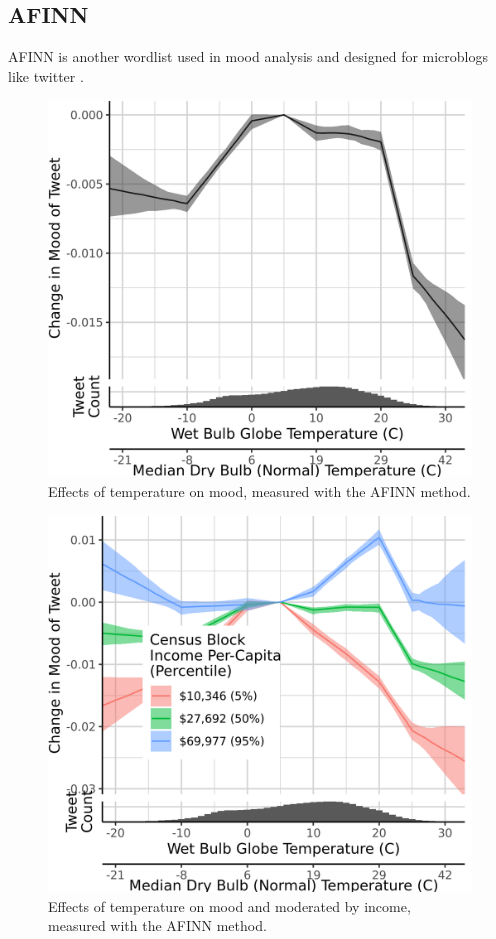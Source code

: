 \documentclass{article}
\begin{document}
\subsection{AFINN}

AFINN is another wordlist used in mood analysis and designed for microblogs like twitter \cite{nielsen2011new}.

\begin{figure}[H]
  \centering
  \includegraphics[width=0.6\linewidth]{../res/afinn-wbgt.png}
  \caption{Effects of temperature on mood, measured with the AFINN method.}
\end{figure}

\begin{figure}[H]
  \centering
  \includegraphics[width=0.6\linewidth]{../res/afinn-wbgt-income.png}
  \caption{Effects of temperature on mood and moderated by income, measured with the AFINN method.}
\end{figure}
\end{document}
